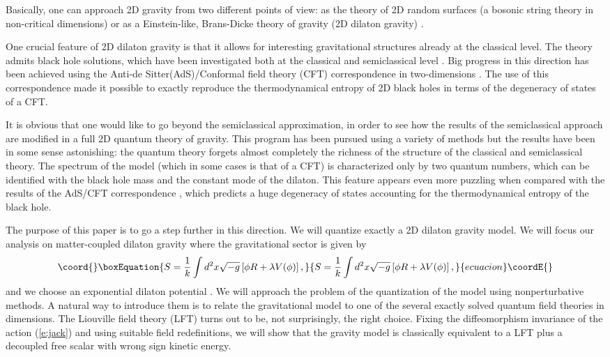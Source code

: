 \documentclass[a4paper,aps,prd,twocolumn,groupedaddress]{revtex4}
\begin{document}
Basically, one can approach 2D gravity from two different points of
view: as the theory of 2D random surfaces (a bosonic string theory in
non-critical dimensions) \cite{pol,kawai} or as a Einstein-like,
Brans-Dicke theory of gravity (2D dilaton gravity) \cite{dilgra,jt}.

One crucial feature of 2D dilaton gravity is that it allows for 
interesting  gravitational structures already at the classical level.
The theory admits black hole solutions, which have been 
investigated both at the classical and semiclassical level 
\cite{kunca}.
Big progress in this direction has been achieved using the Anti-de 
Sitter(AdS)/Conformal field theory (CFT) correspondence in 
two-dimensions \cite{cami,CCKM,cacav,med}.
The use of this correspondence made it possible to exactly reproduce the  
thermodynamical entropy of 2D black holes in terms of the degeneracy 
of states of a CFT. 

It is obvious that one would like to go beyond the semiclassical
approximation, in order to see how the results of the semiclassical
approach are modified in a full 2D quantum theory of gravity.  This
program has been pursued using a variety of methods \cite{jack,CAF}
but the results have been in some sense astonishing: the quantum theory
forgets almost completely the richness of the structure of the
classical and semiclassical theory. The spectrum of the model (which
in some cases is that of a CFT) is characterized only by two quantum
numbers, which can be identified with the black hole mass and the
constant mode of the dilaton.  This feature appears even more puzzling
when compared with the results of the AdS\coordHE{}/CFT\coordHE{} correspondence
\cite{cami}, which predicts a huge degeneracy of states accounting
for the thermodynamical entropy of the black hole.


The purpose of this paper is to go a step further in this direction.
We will quantize exactly a 2D dilaton gravity model.  We will focus
our analysis on matter-coupled dilaton gravity where the gravitational
sector is given by
\begin{equation}\coord{}\boxEquation{\label{e:jack}
S = \frac{1}{k}\int d^2x \sqrt{-g} \left[ \phi R + \lambda V(\phi)\right],
}{S = \frac{1}{k}\int d^2x \sqrt{-g} \left[ \phi R + \lambda V(\phi)\right],
}{ecuacion}\coordE{}\end{equation}
and we choose an exponential dilaton potential \coordHE{}.  We will approach the problem of the quantization of
the model using nonperturbative methods.  A natural way to introduce
them is to relate the gravitational model to one of the several
exactly solved quantum field theories in \coordHE{} dimensions. 
The Liouville field theory (LFT) turns out to be,
not surprisingly, the right choice.  Fixing the diffeomorphism
invariance of the action (\ref{e:jack}) and using suitable field
redefinitions, we will show that the gravity model is classically
equivalent to a LFT plus a decoupled free scalar with wrong sign
kinetic energy.
\end{document}
